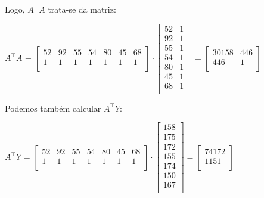 \documentclass{article}
\begin{document}
    Logo, $A^\top A$ trata-se da matriz:
    \begin{center}
        $A^\top A$ =
        $\begin{bmatrix}
            52 & 92 & 55 & 54 & 80 & 45 & 68 \\
            1 & 1 & 1 & 1 & 1 & 1 & 1 \\
        \end{bmatrix}
        \cdot
        \begin{bmatrix}
            52 & 1 \\
            92 & 1 \\
            55 & 1 \\
            54 & 1 \\
            80 & 1 \\
            45 & 1 \\
            68 & 1 \\
        \end{bmatrix}
        =
            \begin{bmatrix}
            30158 & 446 \\
            446 & 1 \\
        \end{bmatrix}$
    \end{center}

    Podemos também calcular $A^\top Y$:
    \begin{center}
        $A^\top Y$ = 
        $\begin{bmatrix}
            52 & 92 & 55 & 54 & 80 & 45 & 68 \\
            1 & 1 & 1 & 1 & 1 & 1 & 1 \\
        \end{bmatrix}
        \cdot
        \begin{bmatrix}
            158 \\
            175 \\
            172 \\
            155 \\
            174 \\
            150 \\
            167 \\
        \end{bmatrix}
        =
        \begin{bmatrix}
            74172 \\
            1151 \\
        \end{bmatrix}$
    \end{center}
\end{document}
